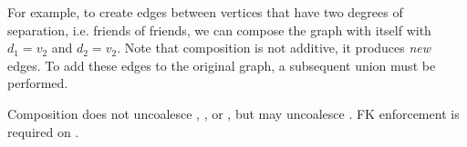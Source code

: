 For example, to create edges between vertices that have two degrees of
separation, i.e. friends of friends, we can compose the graph with
itself with $d_1=v_2$ and $d_2=v_2$.  Note that composition is not
additive, it produces {\em new} edges.  To add these edges to the
original graph, a subsequent union must be performed.  

Composition does not uncoalesce \tv, \te, or \tav, but may uncoalesce
\tae.  FK enforcement is required on \tav.





